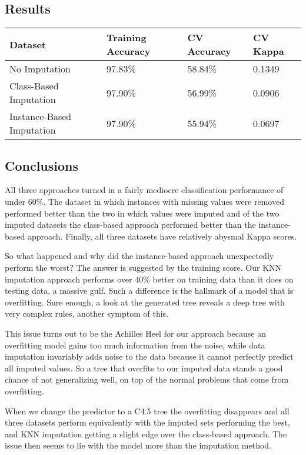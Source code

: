 \documentclass[11pt, letterpaper]{report}
\begin{document}
\subsection{Results}

\begin{tabular}{ |l l l l| }
    \hline
    \textbf{Dataset} & \textbf{Training Accuracy} & \textbf{CV Accuracy} & \textbf{CV Kappa} \\ \hline
    No Imputation & 97.83\% & 58.84\% & 0.1349 \\
    Class-Based Imputation & 97.90\% & 56.99\% & 0.0906 \\
    Instance-Based Imputation & 97.90\% & 55.94\% & 0.0697 \\
    \hline
\end{tabular}

\subsection{Conclusions}

All three approaches turned in a fairly mediocre classification performance of under 60\%. The dataset in which instances with missing values were removed performed better than the two in which values were imputed and of the two imputed datasets the class-based approach performed better than the instance-based approach. Finally, all three datasets have relatively abysmal Kappa scores.

So what happened and why did the instance-based approach unexpectedly perform the worst? The answer is suggested by the training score. Our KNN imputation approach performs over 40\% better on training data than it does on testing data, a massive gulf. Such a difference is the hallmark of a model that is overfitting. Sure enough, a look at the generated tree reveals a deep tree with very complex rules, another symptom of this.

This issue turns out to be the Achilles Heel for our approach because an overfitting model gains too much information from the noise, while data imputation invariably adds noise to the data because it cannot perfectly predict all imputed values. So a tree that overfits to our imputed data stands a good chance of not generalizing well, on top of the normal problems that come from overfitting.

When we change the predictor to a C4.5 tree the overfitting disappears and all three datasets perform equivalently with the imputed sets performing the best, and KNN imputation getting a slight edge over the class-based approach. The issue then seems to lie with the model more than the imputation method.
\end{document}
